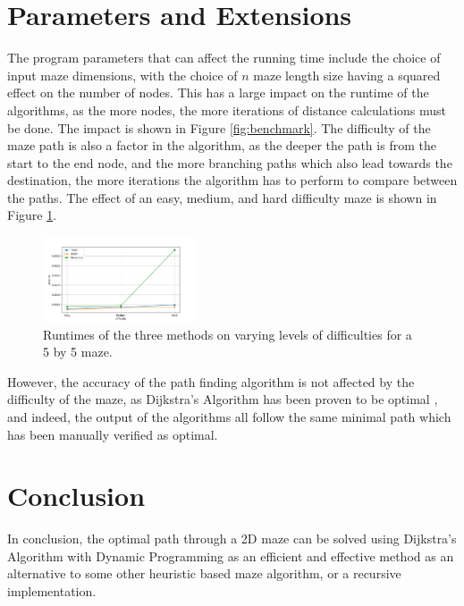 \documentclass[11pt]{article}
\begin{document}
\begin{multicols}{2}
	\section{Parameters and Extensions}
	The program parameters that can affect the running time include the choice of input maze
	dimensions, with the choice of ${n}$ maze length size having a squared effect on the number of
	nodes. This has a large impact on the runtime of the algorithms, as the more nodes, the more
	iterations of distance calculations must be done. The impact is shown in Figure \ref{fig:benchmark}. The difficulty of the maze path is also a factor in the
	algorithm, as the deeper
	the path is from the start to the end node, and the more branching paths which also lead towards
	the destination, the more iterations the algorithm has to perform to compare between the paths. The effect of an easy, medium,
	and hard difficulty maze is shown in Figure \ref{fig:diff}.
	\begin{figure}[H]
		\centering
		\includegraphics[width=0.4\textwidth]{figures/difficulty_7.png}
		\caption{Runtimes of the three methods on varying levels of difficulties for a 5 by 5 maze. \label{fig:diff}}
	\end{figure}

	However, the accuracy of the path finding algorithm is not affected by the difficulty of the
	maze, as Dijkstra's Algorithm has been proven to be optimal \cite{cormen_introduction_2009}, and
	indeed, the output of the algorithms all follow the same minimal path which has been manually
	verified as optimal.

	\section{Conclusion}
	In conclusion, the optimal path through a 2D maze can be solved using Dijkstra's Algorithm with
	Dynamic Programming as an efficient and effective method as an alternative to some other
	heuristic based maze algorithm, or a recursive implementation.

	

\end{multicols}
\end{document}
